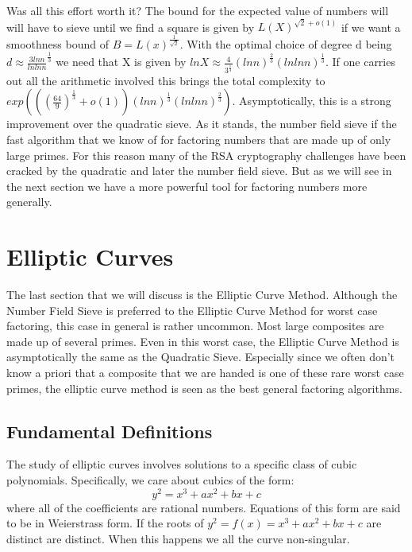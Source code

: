 \documentclass{article}
\begin{document}
Was all this effort worth it? The bound for the expected value of numbers will will have to sieve until we find a square is given by $L(X)^{\sqrt{2} + o(1)}$ if we want a smoothness bound of $B = L(x)^{\frac{1}{\sqrt{2}}}$\cite{pomerance1996multiplicative}. With the optimal choice of degree d being $d \approx \frac{3 ln n}{ln ln n}^\frac{1}{3}$ we need that X is given by $ln X \approx \frac{4}{3^{\frac{1}{3}}} (ln n)^{\frac{2}{3}} ( ln ln n)^\frac{1}{3}$. If one carries out all the arithmetic involved this brings the total complexity to $exp ( ( ( \frac{64}{9})^\frac{1}{3} + o(1)) ( ln n)^{\frac{1}{3}} ( ln ln n)^\frac{2}{3})$. Asymptotically, this is a strong improvement over the quadratic sieve. As it stands, the number field sieve if the fast algorithm that we know of for factoring numbers that are made up of only large primes. For this reason many of the RSA cryptography challenges have been cracked by the quadratic and later the number field sieve. But as we will see in the next section we have a more powerful tool for factoring numbers more generally. 

\section{Elliptic Curves}

The last section that we will discuss is the Elliptic Curve Method. Although the Number Field Sieve is preferred to the Elliptic Curve Method for worst case factoring, this case in general is rather uncommon. Most large composites are made up of several primes. Even in this worst case, the Elliptic Curve Method is asymptotically the same as the Quadratic Sieve. Especially since we often don't know a priori that a composite that we are handed is one of these rare worst case primes, the elliptic curve method is seen as the best general factoring algorithms. 

\subsection{Fundamental Definitions}

The study of elliptic curves involves solutions to a specific class of cubic polynomials. Specifically, we care about cubics of the form: \begin{equation}
    y^2 = x^3 + ax^2 + bx + c 
\end{equation}
where all of the coefficients are rational numbers.  Equations of this form are said to be in Weierstrass form. If the roots of $y^2 = f(x) = x^3 +  ax^2 + bx + c$ are distinct are distinct. When this happens we all the curve non-singular. 
\end{document}

